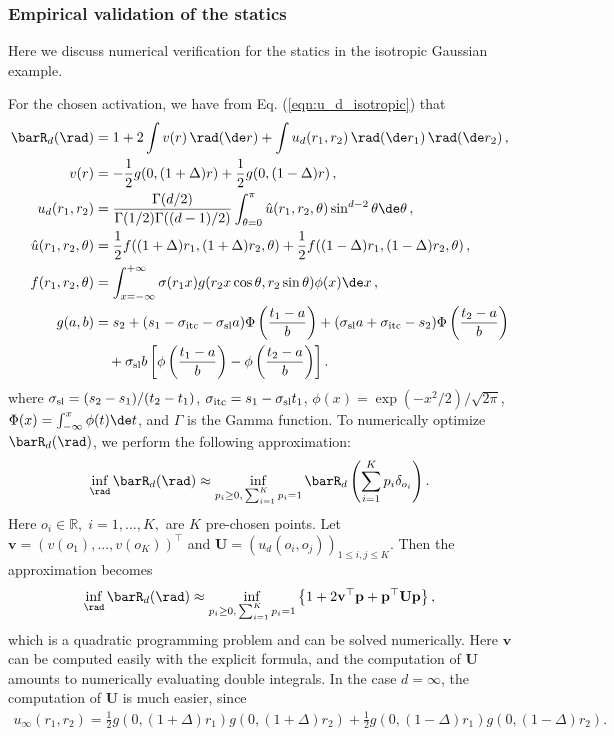 \documentclass[11pt]{article}
\begin{document}
\subsubsection{Empirical validation  of the statics}\label{subsubsec:num_isotropic_stat}
Here we discuss numerical verification for the statics in the isotropic Gaussian example.

 For the chosen activation, we have from Eq. (\ref{eqn:u_d_isotropic}) that
\begin{align}
\barR_d(\rad) &= 1+2 \int v(r) \, \rad(\de r) + \int u_d(r_1,r_2) \, \rad(\de r_1)\,\rad(\de r_2)\, ,\\
v(r) &= -\frac{1}{2}g(0,(1+\Delta)r) + \frac{1}{2}g(0,(1-\Delta)r)\, ,\label{eq:num_iso_v}\\
u_d(r_1,r_2) &= \frac{\Gamma(d/2)}{\Gamma(1/2)\Gamma((d-1)/2)}\int_{\theta=0}^\pi \hat{u}(r_1,r_2,\theta)\sin^{d-2}\theta \de\theta\, ,\label{eq:num_iso_u}\\
\hat{u}(r_1,r_2,\theta) &= \frac{1}{2}f((1+\Delta)r_1,(1+\Delta)r_2,\theta) + \frac{1}{2}f((1-\Delta)r_1,(1-\Delta)r_2,\theta)\, , \\
f(r_1,r_2,\theta) &= \int_{x=-\infty}^{+\infty} \sigma(r_1x)g(r_2x\cos\theta, r_2\sin\theta)\phi(x) \de x\, ,\\
g(a,b) &= s_2 + (s_1-\sigma_{\rm itc}-\sigma_{\rm sl}a)\Phi\left(\frac{t_1-a}{b}\right) + (\sigma_{\rm sl}a+\sigma_{\rm itc}-s_2)\Phi\left(\frac{t_2-a}{b}\right) \nonumber\\
&\quad + \sigma_{\rm sl}b\left[\phi\left(\frac{t_1-a}{b}\right) - \phi\left(\frac{t_2-a}{b}\right)\right].
\end{align}
where $\sigma_{\rm sl}=(s_2-s_1)/(t_2-t_1)$, $\sigma_{\rm itc}=s_1-\sigma_{\rm sl}t_1$, $\phi(x)=\exp(-x^2/2)/\sqrt{2\pi}$, $\Phi(x)= \int_{-\infty}^x\phi(t)\de t$, and $\Gamma$ is the Gamma function. To numerically optimize $\barR_d(\rad)$, we perform the following approximation:
\begin{align}
\inf_{\rad}\barR_d(\rad) \approx \inf_{p_i\geq 0, \, \sum_{i=1}^K p_i=1} \barR_d\left( \sum_{i=1}^K p_i \delta_{o_i} \right).
\end{align}
Here $o_i\in\mathbb{R},\;i=1,...,K,$ are $K$ pre-chosen points. Let $\mathbf{v}=(v(o_1),...,v(o_K))^\top$ and $\mathbf{U}=(u_d(o_i,o_j))_{1\leq i,j\leq K}$. Then the approximation becomes
\begin{align}
\inf_{\rad}\barR_d(\rad) \approx \inf_{p_i\geq 0, \, \sum_{i=1}^K p_i=1} \left\{1 + 2\mathbf{v}^\top\mathbf{p} + \mathbf{p}^\top\mathbf{U}\mathbf{p}\right\},
\end{align}
which is a quadratic programming problem and can be solved numerically. Here $\mathbf{v}$ can be computed easily with the explicit formula, and the computation of $\mathbf{U}$ amounts to numerically evaluating double integrals. In the case $d=\infty$, the computation of $\mathbf{U}$ is much easier, since
\begin{align}
u_\infty(r_1,r_2) = \frac{1}{2}g(0,(1+\Delta)r_1)g(0,(1+\Delta)r_2) + \frac{1}{2}g(0,(1-\Delta)r_1)g(0,(1-\Delta)r_2).
\end{align}
\end{document}
